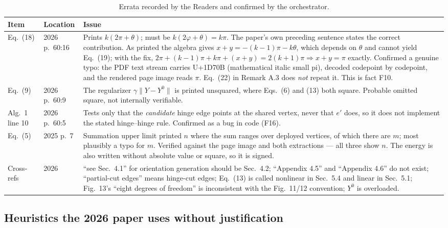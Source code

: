 \documentclass[10pt,a4paper]{article}
\begin{document}
\begin{table}[h]
\centering
\small
\begin{tabular}{@{}llp{95mm}@{}}
\toprule
Item & Location & Issue \\
\midrule
Eq.~(18) & 2026 p.~60:16 & Prints $k(2\pi+\theta)$; must be $k(2\varphi+\theta)=k\pi$. The paper's own preceding sentence states the correct contribution. As printed the algebra gives $x+y=-(k-1)\pi-k\theta$, which depends on $\theta$ and cannot yield Eq.~(19); with the fix, $2\pi+(k-1)\pi+k\pi+(x+y)=2(k+1)\pi \Rightarrow x+y=\pi$ exactly. Confirmed a genuine typo: the PDF text stream carries U+1D70B (mathematical italic small pi), decoded codepoint by codepoint, and the rendered page image reads $\pi$. Eq.~(22) in Remark A.3 does \emph{not} repeat it. This is fact F10. \\
Eq.~(9) & 2026 p.~60:9 & The regularizer $\gamma\|Y-Y^0\|$ is printed unsquared, where Eqs.~(6) and (13) both square. Probable omitted square, not internally verifiable. \\
Alg.~1 line 10 & 2026 p.~60:5 & Tests only that the \emph{candidate} hinge edge points at the shared vertex, never that $e'$ does, so it does not implement the stated hinge--hinge rule. Confirmed as a bug in code (F16). \\
Eq.~(5) & 2025 p.~7 & Summation upper limit printed $n$ where the sum ranges over deployed vertices, of which there are $m$; most plausibly a typo for $m$. Verified against the page image and both extractions --- all three show $n$. The energy is also written without absolute value or square, so it is signed. \\
Cross-refs & 2026 & ``see Sec.~4.1'' for orientation generation should be Sec.~4.2; ``Appendix 4.5'' and ``Appendix 4.6'' do not exist; ``partial-cut edges'' means hinge-cut edges; Eq.~(13) is called nonlinear in Sec.~5.4 and linear in Sec.~5.1; Fig.~13's ``eight degrees of freedom'' is inconsistent with the Fig.~11/12 convention; $Y^0$ is overloaded. \\
\bottomrule
\end{tabular}
\caption{Errata recorded by the Readers and confirmed by the orchestrator.}
\end{table}

\subsection{Heuristics the 2026 paper uses without justification}
\end{document}

